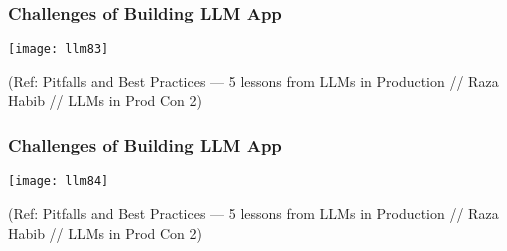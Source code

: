 \begin{frame}[fragile]\frametitle{Challenges of Building LLM App}


\begin{center}
\texttt{[image: llm83]}

\end{center}

{\tiny (Ref: Pitfalls and Best Practices — 5 lessons from LLMs in Production // Raza Habib // LLMs in Prod Con 2)}
\end{frame}

\begin{frame}[fragile]\frametitle{Challenges of Building LLM App}


\begin{center}
\texttt{[image: llm84]}

\end{center}

{\tiny (Ref: Pitfalls and Best Practices — 5 lessons from LLMs in Production // Raza Habib // LLMs in Prod Con 2)}
\end{frame}


